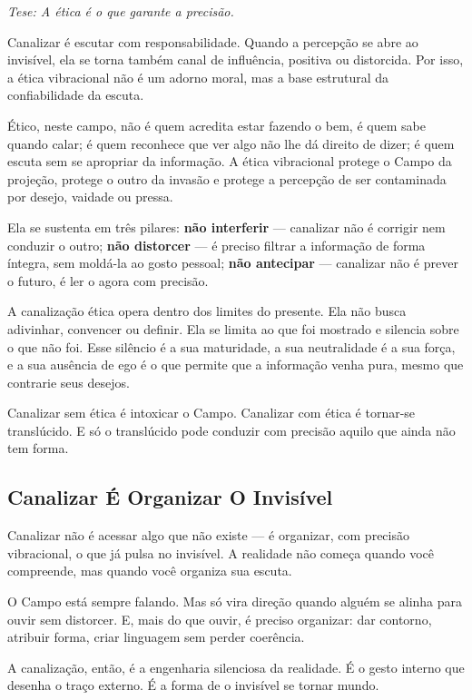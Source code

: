 \documentclass[12pt]{book}
\begin{document}
\textit{Tese: A ética é o que garante a precisão.}

Canalizar é escutar com responsabilidade. Quando a percepção se abre ao invisível, ela se torna também canal de influência, positiva ou distorcida. Por isso, a ética vibracional não é um adorno moral, mas a base estrutural da confiabilidade da escuta.

Ético, neste campo, não é quem acredita estar fazendo o bem, é quem sabe quando calar; é quem reconhece que ver algo não lhe dá direito de dizer; é quem escuta sem se apropriar da informação. A ética vibracional protege o Campo da projeção, protege o outro da invasão e protege a percepção de ser contaminada por desejo, vaidade ou pressa.

Ela se sustenta em três pilares: \textbf{não interferir} --- canalizar não é corrigir nem conduzir o outro; \textbf{não distorcer} --- é preciso filtrar a informação de forma íntegra, sem moldá-la ao gosto pessoal; \textbf{não antecipar} --- canalizar não é prever o futuro, é ler o agora com precisão.

A canalização ética opera dentro dos limites do presente. Ela não busca adivinhar, convencer ou definir. Ela se limita ao que foi mostrado e silencia sobre o que não foi. Esse silêncio é a sua maturidade, a sua neutralidade é a sua força, e a sua ausência de ego é o que permite que a informação venha pura, mesmo que contrarie seus desejos.

Canalizar sem ética é intoxicar o Campo. Canalizar com ética é tornar-se translúcido. E só o translúcido pode conduzir com precisão aquilo que ainda não tem forma.


\subsection*{Canalizar É Organizar O Invisível}

Canalizar não é acessar algo que não existe --- é organizar, com precisão vibracional, o que já pulsa no invisível. A realidade não começa quando você compreende, mas quando você organiza sua escuta.

O Campo está sempre falando. Mas só vira direção quando alguém se alinha para ouvir sem distorcer. E, mais do que ouvir, é preciso organizar: dar contorno, atribuir forma, criar linguagem sem perder coerência.

A canalização, então, é a engenharia silenciosa da realidade. É o gesto interno que desenha o traço externo. É a forma de o invisível se tornar mundo.
\end{document}
